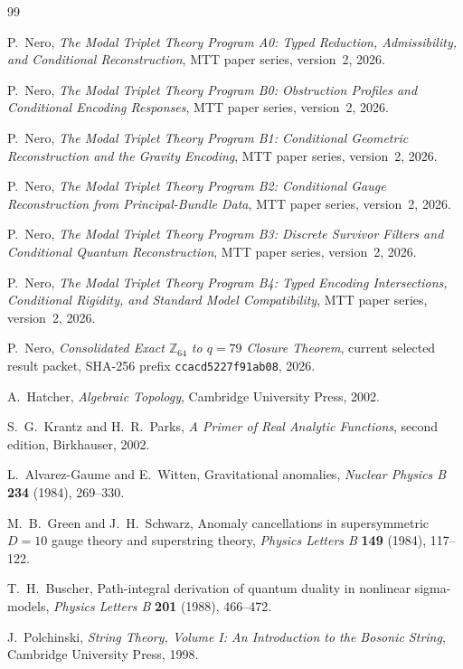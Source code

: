 \documentclass[11pt]{article}
\begin{document}
\begin{thebibliography}{99}

P.~Nero,
\emph{The Modal Triplet Theory Program A0: Typed Reduction, Admissibility,
and Conditional Reconstruction},
MTT paper series, version~2, 2026.

P.~Nero,
\emph{The Modal Triplet Theory Program B0: Obstruction Profiles and
Conditional Encoding Responses},
MTT paper series, version~2, 2026.

P.~Nero,
\emph{The Modal Triplet Theory Program B1: Conditional Geometric
Reconstruction and the Gravity Encoding},
MTT paper series, version~2, 2026.

P.~Nero,
\emph{The Modal Triplet Theory Program B2: Conditional Gauge Reconstruction
from Principal-Bundle Data},
MTT paper series, version~2, 2026.

P.~Nero,
\emph{The Modal Triplet Theory Program B3: Discrete Survivor Filters and
Conditional Quantum Reconstruction},
MTT paper series, version~2, 2026.

P.~Nero,
\emph{The Modal Triplet Theory Program B4: Typed Encoding Intersections,
Conditional Rigidity, and Standard Model Compatibility},
MTT paper series, version~2, 2026.

P.~Nero,
\emph{Consolidated Exact $\mathbb Z_{64}$ to $q=79$ Closure Theorem},
current selected result packet, SHA-256
prefix \texttt{ccacd5227f91ab08},
2026.

A.~Hatcher,
\emph{Algebraic Topology},
Cambridge University Press, 2002.

S.~G.~Krantz and H.~R.~Parks,
\emph{A Primer of Real Analytic Functions},
second edition, Birkhauser, 2002.

L.~Alvarez-Gaume and E.~Witten,
Gravitational anomalies,
\emph{Nuclear Physics B} \textbf{234} (1984), 269--330.

M.~B.~Green and J.~H.~Schwarz,
Anomaly cancellations in supersymmetric $D=10$ gauge theory and superstring
theory,
\emph{Physics Letters B} \textbf{149} (1984), 117--122.

T.~H.~Buscher,
Path-integral derivation of quantum duality in nonlinear sigma-models,
\emph{Physics Letters B} \textbf{201} (1988), 466--472.

J.~Polchinski,
\emph{String Theory, Volume I: An Introduction to the Bosonic String},
Cambridge University Press, 1998.

\end{thebibliography}
\end{document}
